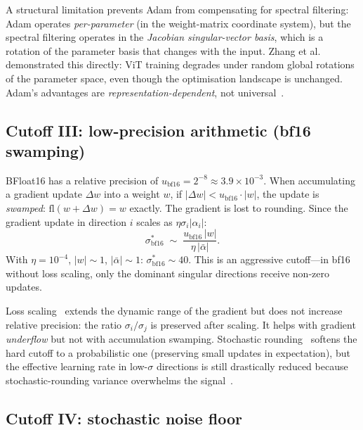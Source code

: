 A structural limitation prevents Adam from compensating for spectral filtering: Adam operates \emph{per-parameter} (in the weight-matrix coordinate system), but the spectral filtering operates in the \emph{Jacobian singular-vector basis}, which is a rotation of the parameter basis that changes with the input. Zhang et al.~\cite{zhang2024adam} demonstrated this directly: ViT training degrades under random global rotations of the parameter space, even though the optimisation landscape is unchanged. Adam's advantages are \emph{representation-dependent}, not universal~\cite{depavia2025rotations}.

\subsection{Cutoff III: low-precision arithmetic (bf16 swamping)}\label{app:cutoff-bf16}

BFloat16 has a relative precision of $u_{\mathrm{bf16}} = 2^{-8} \approx 3.9 \times 10^{-3}$. When accumulating a gradient update $\Delta w$ into a weight $w$, if $|\Delta w| < u_{\mathrm{bf16}} \cdot |w|$, the update is \emph{swamped}: $\mathrm{fl}(w + \Delta w) = w$ exactly. The gradient is lost to rounding. Since the gradient update in direction $i$ scales as $\eta \sigma_i |\alpha_i|$:
\begin{equation}\label{eq:sigma-bf16}
\sigma^*_{\mathrm{bf16}} \;\sim\; \frac{u_{\mathrm{bf16}}\,|w|}{\eta\,|\bar\alpha|}.
\end{equation}
With $\eta = 10^{-4}$, $|w| \sim 1$, $|\bar\alpha| \sim 1$: $\sigma^*_{\mathrm{bf16}} \sim 40$. This is an aggressive cutoff---in bf16 without loss scaling, only the dominant singular directions receive non-zero updates.

Loss scaling~\cite{micikevicius2018mixed} extends the dynamic range of the gradient but does not increase relative precision: the ratio $\sigma_i/\sigma_j$ is preserved after scaling. It helps with gradient \emph{underflow} but not with accumulation swamping. Stochastic rounding~\cite{gupta2015limited} softens the hard cutoff to a probabilistic one (preserving small updates in expectation), but the effective learning rate in low-$\sigma$ directions is still drastically reduced because stochastic-rounding variance overwhelms the signal~\cite{zamirai2020bfloat16}.

\subsection{Cutoff IV: stochastic noise floor}\label{app:cutoff-noise}

